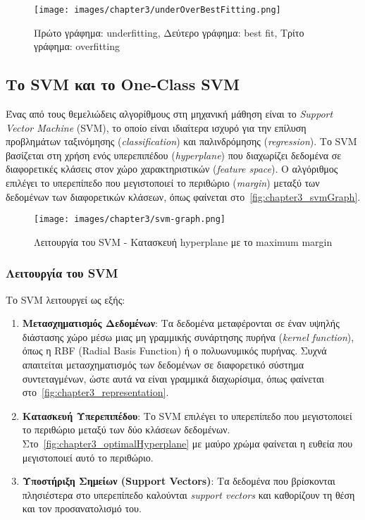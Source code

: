 \begin{figure}[H]
    \centering
    \texttt{[image: images/chapter3/underOverBestFitting.png]}
    \caption{Πρώτο γράφημα: underfitting, Δεύτερο γράφημα: best fit, Τρίτο γράφημα: overfitting}
    \label{fig:chapter3_underOverBestFitting}
\end{figure}

\subsection{Το SVM και το One-Class SVM}
\label{subsec:svm_ocsvm}

Ένας από τους θεμελιώδεις αλγορίθμους στη μηχανική μάθηση είναι το \textit{Support Vector Machine} (SVM), το οποίο είναι ιδιαίτερα ισχυρό για την επίλυση προβλημάτων ταξινόμησης (\textit{classification}) και παλινδρόμησης (\textit{regression}). Το SVM βασίζεται στη χρήση ενός υπερεπιπέδου (\textit{hyperplane}) που διαχωρίζει δεδομένα σε διαφορετικές κλάσεις στον χώρο χαρακτηριστικών (\textit{feature space}). Ο αλγόριθμος επιλέγει το υπερεπίπεδο που μεγιστοποιεί το περιθώριο (\textit{margin}) μεταξύ των δεδομένων των διαφορετικών κλάσεων, όπως φαίνεται στο~\autoref{fig:chapter3_svmGraph}.

\begin{figure}[H]
    \centering
    \texttt{[image: images/chapter3/svm-graph.png]}
    \caption{Λειτουργία του SVM - Κατασκευή hyperplane με το maximum margin}
    \label{fig:chapter3_svmGraph}
\end{figure}

\subsubsection{Λειτουργία του SVM}
Το SVM λειτουργεί ως εξής:
\begin{enumerate}
    \item \textbf{Μετασχηματισμός Δεδομένων}:
    Τα δεδομένα μεταφέρονται σε έναν υψηλής διάστασης χώρο μέσω μιας μη γραμμικής συνάρτησης πυρήνα (\textit{kernel function}), όπως η RBF (Radial Basis Function) ή ο πολυωνυμικός πυρήνας. Συχνά απαιτείται μετασχηματισμός των δεδομένων σε διαφορετικό σύστημα συντεταγμένων, ώστε αυτά να είναι γραμμικά διαχωρίσιμα, όπως φαίνεται στο~\autoref{fig:chapter3_representation}.
    \item \textbf{Κατασκευή Υπερεπιπέδου}:
    Το SVM επιλέγει το υπερεπίπεδο που μεγιστοποιεί το περιθώριο μεταξύ των δύο κλάσεων δεδομένων. Στο~\autoref{fig:chapter3_optimalHyperplane} με μαύρο χρώμα φαίνεται η ευθεία που μεγιστοποιεί αυτό το περιθώριο. 
    \item \textbf{Υποστήριξη Σημείων (Support Vectors)}:
    Τα δεδομένα που βρίσκονται πλησιέστερα στο υπερεπίπεδο καλούνται \textit{support vectors} και καθορίζουν τη θέση και τον προσανατολισμό του.
\end{enumerate}

